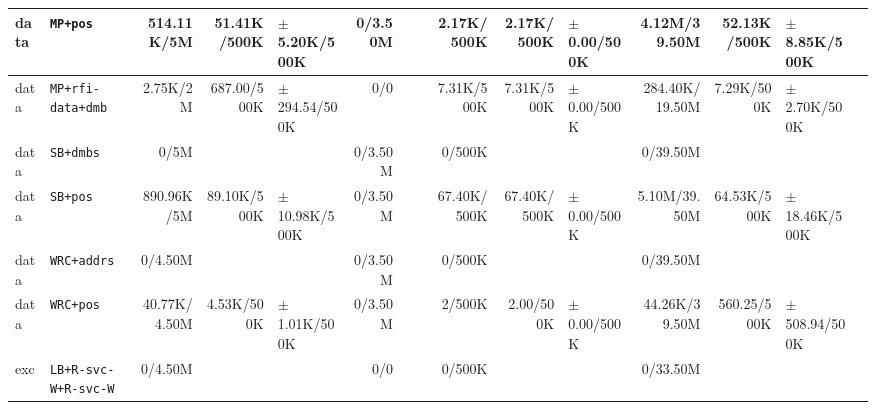 \begin{tabular}{l l  | r r l | r r l | r r l | r r l l}
            data &                                              \verb|MP+pos| &     514.11K/5M &           51.41K/500K &  $\pm$ 5.20K/500K &        0/3.50M &                       &                 &     2.17K/500K &            2.17K/500K &   $\pm$ 0.00/500K &   4.12M/39.50M &           52.13K/500K &  $\pm$ 8.85K/500K & \\ \hline 
            data &                                     \verb|MP+rfi-data+dmb| &       2.75K/2M &           687.00/500K & $\pm$ 294.54/500K &            0/0 &                       &                 &     7.31K/500K &            7.31K/500K &   $\pm$ 0.00/500K & 284.40K/19.50M &            7.29K/500K &  $\pm$ 2.70K/500K & \\ \hline 
            data &                                             \verb|SB+dmbs| &           0/5M &                       &                   &        0/3.50M &                       &                 &         0/500K &                       &                   &       0/39.50M &                       &                   & \\ \hline 
            data &                                              \verb|SB+pos| &     890.96K/5M &           89.10K/500K & $\pm$ 10.98K/500K &        0/3.50M &                       &                 &    67.40K/500K &           67.40K/500K &   $\pm$ 0.00/500K &   5.10M/39.50M &           64.53K/500K & $\pm$ 18.46K/500K & \\ \hline 
            data &                                           \verb|WRC+addrs| &        0/4.50M &                       &                   &        0/3.50M &                       &                 &         0/500K &                       &                   &       0/39.50M &                       &                   & \\ \hline 
            data &                                             \verb|WRC+pos| &   40.77K/4.50M &            4.53K/500K &  $\pm$ 1.01K/500K &        0/3.50M &                       &                 &         2/500K &             2.00/500K &   $\pm$ 0.00/500K &  44.26K/39.50M &           560.25/500K & $\pm$ 508.94/500K & \\ \hline 
             exc &                                  \verb|LB+R-svc-W+R-svc-W| &        0/4.50M &                       &                   &            0/0 &                       &                 &         0/500K &                       &                   &       0/33.50M &                       &                   & \\ \hline 

\end{tabular}
